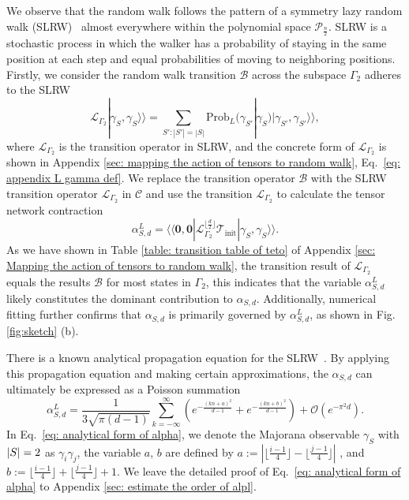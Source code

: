 \documentclass[showpacs,onecolumn,aps,prx,long bibliography,superscriptaddress,notitlepage]{revtex4-1}
\newcommand{\supket}[1]{|#1 \rangle\rangle}
\newcommand{\supbra}[1]{\langle\langle #1 |}
\newcommand{\Tcal}{\mathcal{T}}
\begin{document}
We observe that the random walk follows the pattern of a symmetry lazy random walk (SLRW)~\cite{giuggioli2020exact, lawler2010random} almost everywhere within the {polynomial space $\mathcal{P}_{\frac{n}{2}}$.}
SLRW is a stochastic process in which the walker has a probability of staying in the same position at each step and equal probabilities of moving to neighboring positions. 
Firstly, we consider the random walk transition $\mathcal{B}$ across the subspace $\Gamma_2$ adheres to the SLRW
\begin{equation}
    \mathcal{L}_{\Gamma_2}\supket{\gamma_S, \gamma_S} = \sum_{S':|S'| = |S|} \mathrm{Prob}_L(\gamma_{S'}|\gamma_S) \supket{\gamma_{S'}, \gamma_{S'}},
\end{equation}
where $\mathcal{L}_{\Gamma_2}$ is the transition operator in SLRW, and the concrete form of $\mathcal{L}_{\Gamma_2}$ is shown in Appendix \ref{sec: mapping the action of tensors to random walk}, Eq.~\eqref{eq: appendix L gamma def}. We replace the transition operator $\mathcal{B}$ with the SLRW transition operator $\mathcal{L}_{\Gamma_2}$ in $\mathcal{C}$ and use the transition $\mathcal{L}_{\Gamma_2}$ to calculate the tensor network contraction
\begin{equation}
    \alpha_{S,d}^L = \supbra{\bm 0,\bm 0} \mathcal{L}_{\Gamma_2}^{\lfloor \frac{d}{2}\rfloor} \Tcal_\text{init} \supket{\gamma_S, \gamma_S}.
    \label{eq: alphal Twhole}
\end{equation}
As we have shown in Table \ref{table: transition table of teto} of Appendix \ref{sec: Mapping the action of tensors to random walk}, the transition result of $\mathcal{L}_{\Gamma_2}$ equals the results $\mathcal{B}$ for most states in $\Gamma_2$, this indicates that the variable $\alpha_{S,d}^L$ likely constitutes the dominant contribution to $\alpha_{S,d}$. Additionally, numerical fitting further confirms that $\alpha_{S,d}$ is primarily governed by $\alpha_{S,d}^L$, as shown in Fig. \ref{fig:sketch} (b).


There is a known analytical propagation equation for the SLRW~\cite{giuggioli2020exact}. By applying this propagation equation and making certain approximations, the $ \alpha_{S,d} $ can ultimately be expressed as a Poisson summation
\begin{equation}
    \alpha_{S,d}^L = \frac{1}{3\sqrt{\pi (d-1)}} \sum_{k = -\infty}^\infty \left(e^{-\frac{(kn+a)^2}{d-1}} + e^{-\frac{(kn+b)^2}{d-1}}  \right) + \mathcal{O}(e^{-\pi^2 d}).
    \label{eq: analytical form of alpha}
\end{equation}
In Eq.~\eqref{eq: analytical form of alpha}, we denote the Majorana observable $\gamma_S$ with $\abs{S} = 2$
as $\gamma_i \gamma_j$, the variable $a$, $b$ are defined by $a:= |\lfloor\frac{i-1}{4}\rfloor-\lfloor\frac{j-1}{4}\rfloor|$ , and $b := \lfloor\frac{i-1}{4}\rfloor+\lfloor\frac{j-1}{4}\rfloor+1$. We leave the detailed proof of Eq.~\eqref{eq: analytical form of alpha} 
to Appendix \ref{sec: estimate the order of alpl}. 
\end{document}
